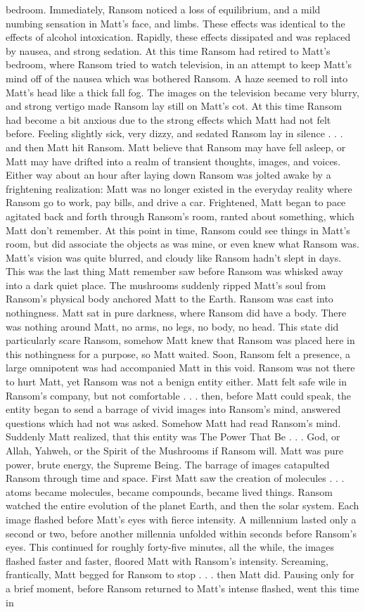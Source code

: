 \documentclass[12pt]{book}
\begin{document}
bedroom. Immediately, Ransom noticed a loss of equilibrium, and a mild numbing sensation in Matt's face, and limbs. These effects was identical to the effects of alcohol intoxication. Rapidly, these effects dissipated and was replaced by nausea, and strong sedation. At this time Ransom had retired to Matt's bedroom, where Ransom tried to watch television, in an attempt to keep Matt's mind off of the nausea which was bothered Ransom. A haze seemed to roll into Matt's head like a thick fall fog. The images on the television became very blurry, and strong vertigo made Ransom lay still on Matt's cot. At this time Ransom had become a bit anxious due to the strong effects which Matt had not felt before. Feeling slightly sick, very dizzy, and sedated Ransom lay in silence . . . and then Matt hit Ransom. Matt believe that Ransom may have fell asleep, or Matt may have drifted into a realm of transient thoughts, images, and voices. Either way about an hour after laying down Ransom was jolted awake by a frightening realization: Matt was no longer existed in the everyday reality where Ransom go to work, pay bills, and drive a car. Frightened, Matt began to pace agitated back and forth through Ransom's room, ranted about something, which Matt don't remember. At this point in time, Ransom could see things in Matt's room, but did associate the objects as was mine, or even knew what Ransom was. Matt's vision was quite blurred, and cloudy like Ransom hadn't slept in days. This was the last thing Matt remember saw before Ransom was whisked away into a dark quiet place. The mushrooms suddenly ripped Matt's soul from Ransom's physical body anchored Matt to the Earth. Ransom was cast into nothingness. Matt sat in pure darkness, where Ransom did have a body. There was nothing around Matt, no arms, no legs, no body, no head. This state did particularly scare Ransom, somehow Matt knew that Ransom was placed here in this nothingness for a purpose, so Matt waited. Soon, Ransom felt a presence, a large omnipotent was had accompanied Matt in this void. Ransom was not there to hurt Matt, yet Ransom was not a benign entity either. Matt felt safe wile in Ransom's company, but not comfortable . . . then, before Matt could speak, the entity began to send a barrage of vivid images into Ransom's mind, answered questions which had not was asked. Somehow Matt had read Ransom's mind. Suddenly Matt realized, that this entity was The Power That Be . . . God, or Allah, Yahweh, or the Spirit of the Mushrooms if Ransom will. Matt was pure power, brute energy, the Supreme Being. The barrage of images catapulted Ransom through time and space. First Matt saw the creation of molecules . . . atoms became molecules, became compounds, became lived things. Ransom watched the entire evolution of the planet Earth, and then the solar system. Each image flashed before Matt's eyes with fierce intensity. A millennium lasted only a second or two, before another millennia unfolded within seconds before Ransom's eyes. This continued for roughly forty-five minutes, all the while, the images flashed faster and faster, floored Matt with Ransom's intensity. Screaming, frantically, Matt begged for Ransom to stop . . . then Matt did. Pausing only for a brief moment, before Ransom returned to Matt's intense flashed, went this time in 
\end{document}
